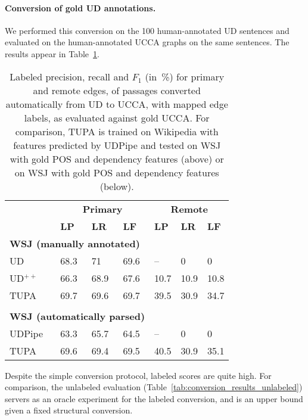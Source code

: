 \documentclass[11pt,a4paper]{article}
\begin{document}
\paragraph{Conversion of gold UD annotations.}

We performed this conversion on the 100 human-annotated UD sentences
and evaluated on the human-annotated UCCA graphs on the same sentences.
The results appear in Table~\ref{tab:conversion_results_labeled}.

\begin{table}[t]
\centering
\begin{tabular}{l|lll|lll}
& \multicolumn{3}{c|}{\footnotesize \bf Primary} & \multicolumn{3}{c}{\footnotesize \bf Remote} \\
& \footnotesize \textbf{LP} & \footnotesize \textbf{LR} & \footnotesize \textbf{LF}
& \footnotesize \textbf{LP} & \footnotesize \textbf{LR} & \footnotesize \textbf{LF} \\
\hline
\multicolumn{4}{l|}{\small \bf WSJ (manually annotated)} & \\
\footnotesize UD
& 68.3 & 71 & 69.6 & -- & 0 & 0 \\
\footnotesize UD$^{++}$
& 66.3 & 68.9 & 67.6 & 10.7 & 10.9 & 10.8 \\
\footnotesize TUPA
& 69.7 & 69.6 & 69.7 & 39.5 & 30.9 & 34.7 \\
\\
\multicolumn{4}{l|}{\small \bf WSJ (automatically parsed)} & \\
UDPipe & 63.3 & 65.7 & 64.5 & -- & 0 & 0 \\
\footnotesize TUPA
& 69.6 & 69.4 & 69.5 & 40.5 & 30.9 & 35.1
\end{tabular}
\caption{
Labeled precision, recall and $F_1$ (in~\%) for primary and remote edges,
of passages converted automatically from UD to UCCA,
with mapped edge labels, as evaluated against gold UCCA.
For comparison, TUPA \cite{hershcovich2017a} is trained on Wikipedia with features predicted by UDPipe
and tested on WSJ with gold POS and dependency features (above)
or on WSJ with gold POS and dependency features (below).
\label{tab:conversion_results_labeled}}
\end{table}

Despite the simple conversion protocol, labeled scores are quite high.
For comparison, the unlabeled evaluation (Table~\ref{tab:conversion_results_unlabeled})
servers as an oracle experiment for the labeled conversion,
and is an upper bound given a fixed structural conversion.
\end{document}
